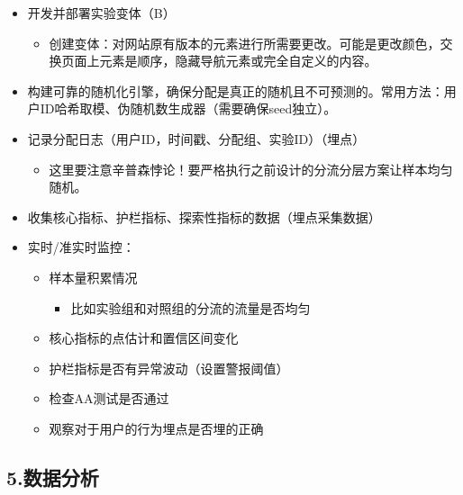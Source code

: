 \documentclass[
  letterpaper,
  DIV=11,
  numbers=noendperiod]{scrreprt}
\providecommand{\tightlist}{%
  \setlength{\itemsep}{0pt}\setlength{\parskip}{0pt}}
\begin{document}
\begin{itemize}
\item
  开发并部署实验变体（B）

  \begin{itemize}
  \tightlist
  \item
    创建变体：对网站原有版本的元素进行所需要更改。可能是更改颜色，交换页面上元素是顺序，隐藏导航元素或完全自定义的内容。
  \end{itemize}
\item
  构建可靠的随机化引擎，确保分配是真正的随机且不可预测的。常用方法：用户ID哈希取模、伪随机数生成器（需要确保seed独立）。
\item
  记录分配日志（用户ID，时间戳、分配组、实验ID）（埋点）

  \begin{itemize}
  \tightlist
  \item
    这里要注意辛普森悖论！要严格执行之前设计的分流分层方案让样本均匀随机。
  \end{itemize}
\item
  收集核心指标、护栏指标、探索性指标的数据（埋点采集数据）
\item
  实时/准实时监控：

  \begin{itemize}
  \item
    样本量积累情况

    \begin{itemize}
    \tightlist
    \item
      比如实验组和对照组的分流的流量是否均匀
    \end{itemize}
  \item
    核心指标的点估计和置信区间变化
  \item
    护栏指标是否有异常波动（设置警报阈值）
  \item
    检查AA测试是否通过
  \item
    观察对于用户的行为埋点是否埋的正确
  \end{itemize}
\end{itemize}

\subsection{5.数据分析}\label{ux6570ux636eux5206ux6790}
\end{document}
